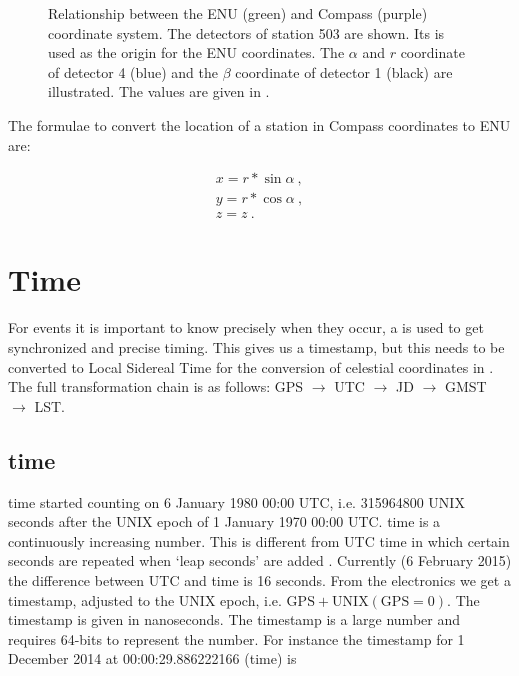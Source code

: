 \begin{figure}
    \centering
    
    \caption{Relationship between the ENU (green) and Compass (purple)
             coordinate system. The detectors of station 503 are shown.
             Its \gps is used as the origin for the ENU coordinates. The
             $\alpha$ and $r$ coordinate of detector 4 (blue) and the
             $\beta$ coordinate of detector 1 (black) are illustrated.
             The values are given in .}
    \label{fig:enu_compass}
\end{figure}

The formulae to convert the location of a station in Compass coordinates
to ENU are:

\begin{equation}
    \begin{array}{l}
        x = r * \sin{\alpha} \ , \\
        y = r * \cos{\alpha} \ , \\
        z = z \ .
    \end{array}
\end{equation}


\section{Time}
\label{sec:time}

For \hisparc events it is important to know precisely when they occur, a
\gps is used to get synchronized and precise timing. This gives us a
timestamp, but this needs to be converted to Local Sidereal Time for the
conversion of celestial coordinates in . The full
transformation chain is as follows: GPS $\to$ UTC $\to$ JD $\to$ GMST
$\to$ LST.


\subsection{\gps time}

\gps time started counting on 6 January 1980 00:00 UTC, i.e.
\num{315964800} UNIX seconds after the UNIX epoch of 1 January 1970
00:00 UTC. \gps time is a continuously increasing number. This is
different from UTC time in which certain seconds are repeated when `leap
seconds' are added \cite{usno:2012aa}. Currently (6 February 2015) the
difference between UTC and \gps time is 16 seconds. From the \hisparc
electronics we get a \gps timestamp, adjusted to the UNIX epoch, i.e.
$\mathrm{GPS} + \mathrm{UNIX(GPS=0)}$. The timestamp is given in
nanoseconds. The \gps timestamp is a large number and requires 64-bits
to represent the number. For instance the \gps timestamp for 1 December
2014 at 00:00:29.886222166 (\gps time) is

